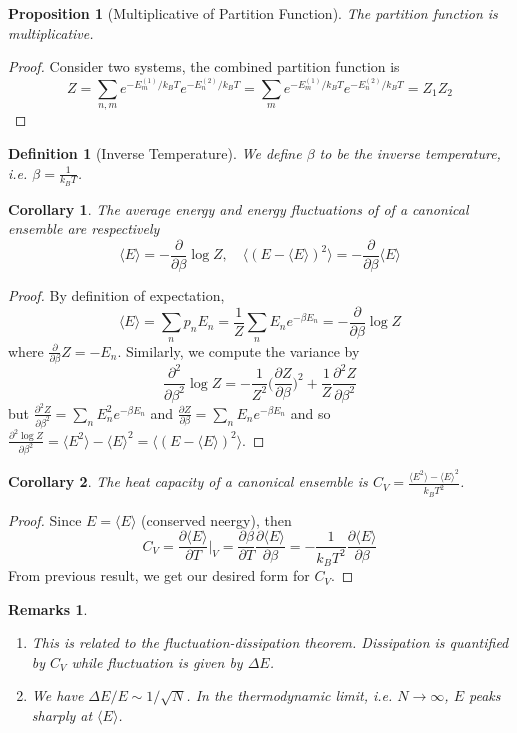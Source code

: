\documentclass[a4paper]{article}
\newtheorem{remarks}{Remarks}[section]
\theoremstyle{new}
\newtheorem{defi}{Definition}[section]
\newtheorem{prop}{Proposition}[section]
\newtheorem{cor}{Corollary}[section]
\begin{document}
\begin{prop}[Multiplicative of Partition Function]
The partition function is multiplicative.
\end{prop}
\begin{proof}
Consider two systems, the combined partition function is
$$Z=\sum_{n,m}e^{-E_m^{(1)}/k_BT}e^{- E_n^{(2)}/k_BT}=\sum_me^{-E_m^{(1)}/k_BT}e^{-E_n^{(2)}/k_BT}=Z_1Z_2$$
\end{proof}
\begin{defi}[Inverse Temperature]
We define $\beta$ to be the inverse temperature, i.e. $\beta=\frac{1}{k_BT}$.
\end{defi}
\begin{cor}
The average energy and energy fluctuations of of a canonical ensemble are respectively
$$\langle E\rangle=-\frac{\partial}{\partial\beta}\log Z,\quad\langle (E-\langle E\rangle)^2\rangle=-\frac{\partial}{\partial\beta}\langle E\rangle$$
\end{cor}
\begin{proof}
By definition of expectation,
$$\langle E\rangle=\sum_np_nE_n=\frac{1}{Z}\sum_nE_ne^{-\beta E_n}=-\frac{\partial}{\partial\beta}\log Z$$
where $\frac{\partial}{\partial\beta}Z=-E_n$. Similarly, we compute the variance by
$$\frac{\partial^2}{\partial\beta^2}\log Z=-\frac{1}{Z^2}\bigg(\frac{\partial Z}{\partial\beta}\bigg)^2+\frac{1}{Z}\frac{\partial^2Z}{\partial\beta^2}$$
but $\frac{\partial^2Z}{\partial\beta^2}=\sum_nE_n^2e^{-\beta E_n}$ and $\frac{\partial Z}{\partial\beta}=\sum_nE_ne^{-\beta E_n}$ and so $\frac{\partial^2\log Z}{\partial\beta^2}=\langle E^2\rangle-\langle E\rangle^2=\langle (E-\langle E\rangle)^2\rangle$. 
\end{proof}
\begin{cor}
The heat capacity of a canonical ensemble is $C_V=\frac{\langle E^2\rangle-\langle E\rangle^2}{k_BT^2}$.
\end{cor}
\begin{proof}
Since $E=\langle E\rangle$ (conserved neergy), then
$$C_V=\frac{\partial\langle E\rangle}{\partial T}\bigg|_V=\frac{\partial\beta}{\partial T}\frac{\partial\langle E\rangle}{\partial\beta}=-\frac{1}{k_BT^2}\frac{\partial\langle E\rangle}{\partial\beta}$$
From previous result, we get our desired form for $C_V$.
\end{proof}
\begin{remarks}\leavevmode
\begin{enumerate}
\item This is related to the fluctuation-dissipation theorem. Dissipation is quantified by $C_V$ while fluctuation is given by $\Delta E$.
\item We have $\Delta E/E\sim1/\sqrt{N}$. In the thermodynamic limit, i.e. $N\rightarrow\infty$, $E$ peaks sharply at $\langle E\rangle$.
\end{enumerate}
\end{remarks}
\end{document}
